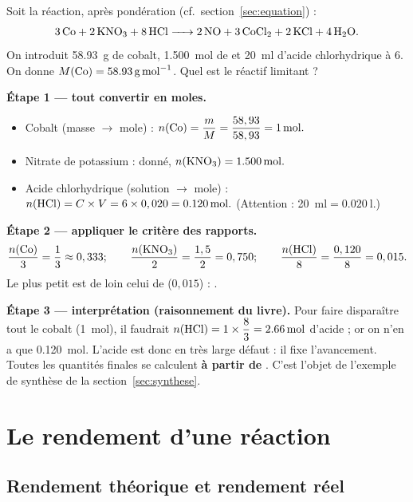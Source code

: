 \documentclass[11pt,a4paper]{article}
\begin{document}
\begin{exemple}
\label{ex:cobalt}
Soit la réaction, après pondération (cf.\ section~\ref{sec:equation}) :
\[
\ce{3 Co + 2 KNO3 + 8 HCl -> 2 NO + 3 CoCl2 + 2 KCl + 4 H2O}.
\]
On introduit \SI{58,93}{\gram} de cobalt, \SI{1,500}{\mole} de  et \SI{20}{\milli\litre}
d'acide chlorhydrique à \SI{6}{\Molar}. On donne $M(\ce{Co})=\SI{58,93}{\gram\per\mole}$. Quel est le
réactif limitant ?

\smallskip
\textbf{Étape 1 — tout convertir en moles.}
\begin{itemize}[leftmargin=1.6em,topsep=2pt,itemsep=1pt]
  \item Cobalt (masse $\to$ mole) : $n(\ce{Co})=\dfrac{m}{M}=\dfrac{58,93}{58,93}=\SI{1}{\mole}.$
  \item Nitrate de potassium : donné, $n(\ce{KNO3})=\SI{1,500}{\mole}.$
  \item Acide chlorhydrique (solution $\to$ mole) : $n(\ce{HCl})=C\times V=6\times0,020=\SI{0,120}{\mole}.$
        (Attention : \SI{20}{\milli\litre}$=\SI{0,020}{\litre}$.)
\end{itemize}

\textbf{Étape 2 — appliquer le critère des rapports.}
\[
\frac{n(\ce{Co})}{3}=\frac{1}{3}\approx0,333 ;\qquad
\frac{n(\ce{KNO3})}{2}=\frac{1,5}{2}=0,750 ;\qquad
\frac{n(\ce{HCl})}{8}=\frac{0,120}{8}=0,015 .
\]
Le plus petit est de loin celui de  ($0,015$) : .

\textbf{Étape 3 — interprétation (raisonnement du livre).} Pour faire disparaître tout le cobalt
(1~mol), il faudrait $n(\ce{HCl})=1\times\dfrac{8}{3}=\SI{2,66}{\mole}$ d'acide ; or on n'en a que
\SI{0,120}{\mole}. L'acide est donc en très large défaut : il fixe l'avancement. Toutes les
quantités finales se calculent \textbf{à partir de }. C'est l'objet de l'exemple de
synthèse de la section~\ref{sec:synthese}.
\end{exemple}

\section{Le rendement d'une réaction}
\label{sec:rendement}
\subsection{Rendement théorique et rendement réel}
\end{document}
